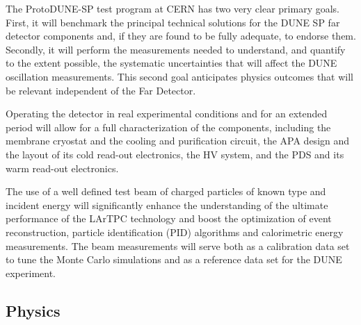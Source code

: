 The ProtoDUNE-SP test program at CERN has two very clear primary goals. First, it will benchmark the principal technical solutions for the DUNE SP far detector components and, if they are found to be fully adequate, to endorse them. Secondly, it will perform the measurements needed to understand, and quantify to the extent possible, the systematic uncertainties that will affect the DUNE oscillation measurements. This second goal anticipates physics outcomes that will be relevant independent of the Far Detector.

Operating the detector in real experimental conditions and for an extended period will allow for a full characterization of the components, including the membrane cryostat and the cooling and purification circuit, the APA design and the layout of its cold read-out electronics, the HV system, and the PDS and its warm read-out electronics.

The use of a well defined test beam of charged particles of known type and incident  energy will significantly enhance the understanding of the ultimate performance of the LArTPC technology and boost the optimization of event reconstruction, particle identification (PID) algorithms and calorimetric energy measurements.  The beam measurements will serve both as a calibration data set to tune the Monte Carlo simulations and as a reference data set for the DUNE experiment. 

\subsection{Physics}


